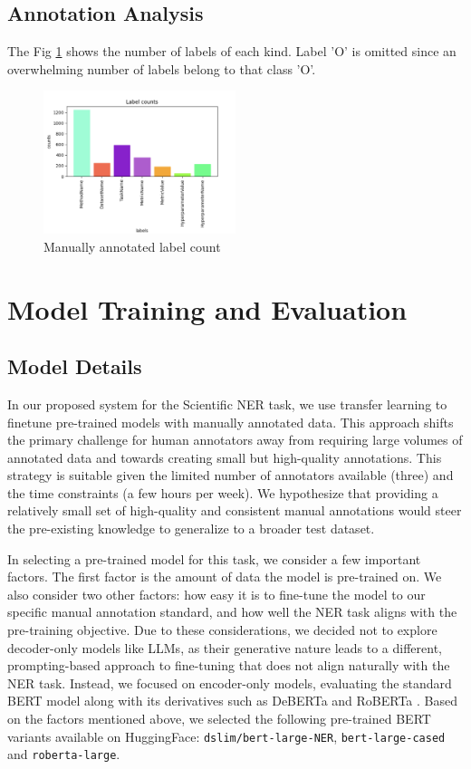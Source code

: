 \documentclass[11pt]{article}
\begin{document}
\subsection{Annotation Analysis}
The Fig \ref{fig:overall} shows the number of labels of each kind. Label 'O' is omitted since an overwhelming number of labels belong to that class 'O'.
\begin{figure}[ht]
    \centering
    \includegraphics[width=0.5\textwidth]{images/manual_annotated_label.png}
    \caption{Manually annotated label count}
    \label{fig:overall}
\end{figure}

\section{Model Training and Evaluation}\label{sec:model}
\subsection{Model Details}
In our proposed system for the Scientific NER task, we use transfer learning to finetune pre-trained models with manually annotated data. This approach shifts the primary challenge for human annotators away from requiring large volumes of annotated data and towards creating small but high-quality annotations. This strategy is suitable given the limited number of annotators available (three) and the time constraints (a few hours per week). We hypothesize that providing a relatively small set of high-quality and consistent manual annotations would steer the pre-existing knowledge to generalize to a broader test dataset.

In selecting a pre-trained model for this task, we consider a few important factors. The first factor is the amount of data the model is pre-trained on. We also consider two other factors: how easy it is to fine-tune the model to our specific manual annotation standard, and how well the NER task aligns with the pre-training objective. Due to these considerations, we decided not to explore decoder-only models like LLMs, as their generative nature leads to a different, prompting-based approach to fine-tuning that does not align naturally with the NER task. Instead, we focused on encoder-only models, evaluating the standard BERT \cite{Devlin2019BERTPO} model along with its derivatives such as DeBERTa \cite{He2020DeBERTaDB} and RoBERTa  \cite{Liu2019RoBERTaAR}. Based on the factors mentioned above, we selected the following pre-trained BERT variants available on HuggingFace: \texttt{dslim/bert-large-NER}, \texttt{bert-large-cased} and \texttt{roberta-large}.
\end{document}
